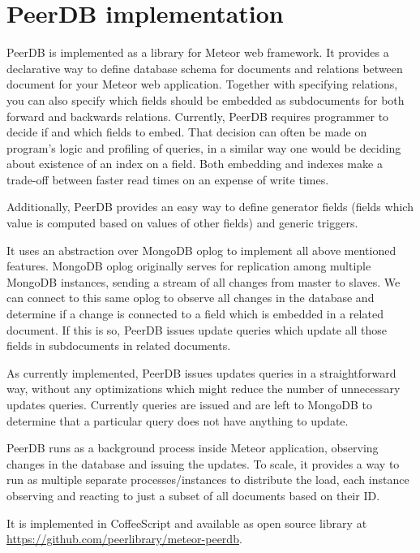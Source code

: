 \section{PeerDB implementation}

PeerDB is implemented as a library for Meteor web framework.
It provides a declarative way to define database schema for documents and relations between document for your Meteor web application.
Together with specifying relations, you can also specify which fields should be embedded as subdocuments for both forward and backwards relations.
Currently, PeerDB requires programmer to decide if and which fields to embed.
That decision can often be made on program's logic and profiling of queries, in a similar way one would be deciding about existence of an index on a field.
Both embedding and indexes make a trade-off between faster read times on an expense of write times.

Additionally, PeerDB provides an easy way to define generator fields (fields which value is computed based on values of other fields) and generic triggers.

It uses an abstraction over MongoDB oplog to implement all above mentioned features.
MongoDB oplog originally serves for replication among multiple MongoDB instances, sending a stream of all changes from master to slaves.
We can connect to this same oplog to observe all changes in the database and determine if a change is connected to a field which is embedded in a related document.
If this is so, PeerDB issues update queries which update all those fields in subdocuments in related documents.

As currently implemented, PeerDB issues updates queries in a straightforward way, without any optimizations which might reduce the number of unnecessary updates queries.
Currently queries are issued and are left to MongoDB to determine that a particular query does not have anything to update.

PeerDB runs as a background process inside Meteor application, observing changes in the database and issuing the updates.
To scale, it provides a way to run as multiple separate processes/instances to distribute the load, each instance observing and reacting to just a subset of all documents based on their ID.

It is implemented in CoffeeScript and available as open source library at \url{https://github.com/peerlibrary/meteor-peerdb}.